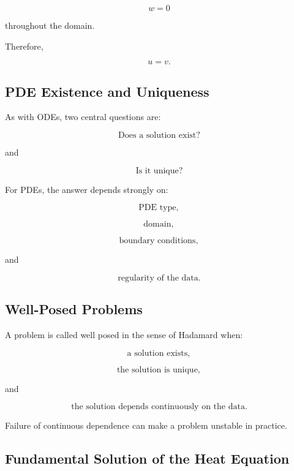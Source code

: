 \[
\boxed{
w=0
}
\]

throughout the domain.

Therefore,

\[
\boxed{
u=v.
}
\]

\subsection{PDE Existence and Uniqueness}
\label{subsec:pde-existence-uniqueness}

As with ODEs, two central questions are:

\[
\boxed{
\text{Does a solution exist?}
}
\]

and

\[
\boxed{
\text{Is it unique?}
}
\]

For PDEs, the answer depends strongly on:

\[
\boxed{
\text{PDE type},
}
\]

\[
\boxed{
\text{domain},
}
\]

\[
\boxed{
\text{boundary conditions},
}
\]

and

\[
\boxed{
\text{regularity of the data}.
}
\]

\subsection{Well-Posed Problems}
\label{subsec:well-posed-pde}

A problem is called well posed in the sense of Hadamard when:

\[
\boxed{
\text{a solution exists},
}
\]

\[
\boxed{
\text{the solution is unique},
}
\]

and

\[
\boxed{
\text{the solution depends continuously on the data}.
}
\]

Failure of continuous dependence can make a problem unstable in practice.

\subsection{Fundamental Solution of the Heat Equation}
\label{subsec:heat-fundamental-solution}

